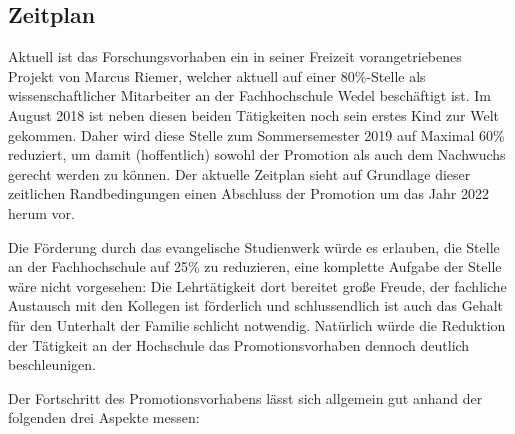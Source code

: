 \documentclass[paper=a4,fontsize=11pt,parskip=half]{scrartcl}
\begin{document}
\subsection{Zeitplan}

Aktuell ist das Forschungsvorhaben ein in seiner Freizeit vorangetriebenes Projekt von Marcus Riemer, welcher aktuell auf einer 80\%-Stelle als wissenschaftlicher Mitarbeiter an der Fachhochschule Wedel beschäftigt ist. Im August 2018 ist neben diesen beiden Tätigkeiten noch sein erstes Kind zur Welt gekommen. Daher wird diese Stelle zum Sommersemester 2019 auf Maximal 60\% reduziert, um damit (hoffentlich) sowohl der Promotion als auch dem Nachwuchs gerecht werden zu können. Der aktuelle Zeitplan sieht auf Grundlage dieser zeitlichen Randbedingungen einen Abschluss der Promotion um das Jahr 2022 herum vor.

Die Förderung durch das evangelische Studienwerk würde es erlauben, die Stelle an der Fachhochschule auf 25\% zu reduzieren, eine komplette Aufgabe der Stelle wäre nicht vorgesehen: Die Lehrtätigkeit dort bereitet große Freude, der fachliche Austausch mit den Kollegen ist förderlich und schlussendlich ist auch das Gehalt für den Unterhalt der Familie schlicht notwendig. Natürlich würde die Reduktion der Tätigkeit an der Hochschule das Promotionsvorhaben dennoch deutlich beschleunigen.

Der Fortschritt des Promotionsvorhabens lässt sich allgemein gut anhand der folgenden drei Aspekte messen:
\end{document}
